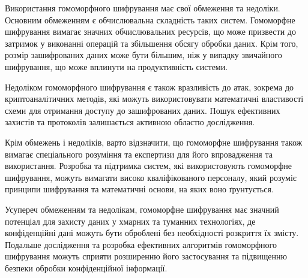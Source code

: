 Використання гомоморфного шифрування має свої обмеження та недоліки. Основним обмеженням є обчислювальна складність таких систем. Гомоморфне шифрування вимагає значних обчислювальних ресурсів, що може призвести до затримок у виконанні операцій та збільшення обсягу обробки даних. Крім того, розмір зашифрованих даних може бути більшим, ніж у випадку звичайного шифрування, що може вплинути на продуктивність системи.

Недоліком гомоморфного шифрування є також вразливість до атак, зокрема до криптоаналітичних методів, які можуть використовувати математичні властивості схеми для отримання доступу до зашифрованих даних. Пошук ефективних захистів та протоколів залишається активною областю дослідження.

Крім обмежень і недоліків, варто відзначити, що гомоморфне шифрування також вимагає спеціального розуміння та експертизи для його впровадження та використання. Розробка та підтримка систем, які використовують гомоморфне шифрування, можуть вимагати високо кваліфікованого персоналу, який розуміє принципи шифрування та математичні основи, на яких воно ґрунтується.

Усупереч обмеженням та недолікам, гомоморфне шифрування має значний потенціал для захисту даних у хмарних та туманних технологіях, де конфіденційні дані можуть бути оброблені без необхідності розкриття їх змісту. Подальше дослідження та розробка ефективних алгоритмів гомоморфного шифрування можуть сприяти розширенню його застосування та підвищенню безпеки обробки конфіденційної інформації.
